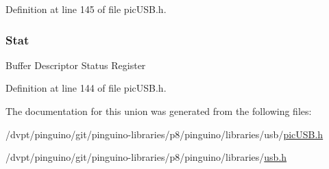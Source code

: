 Definition at line 145 of file pic\-U\-S\-B.\-h.

\hypertarget{union_buffer_descriptor_table_a6cd0cf5f5c11f77a2597bd70e392b4b8}{
\subsubsection[{Stat}]{ Stat}}\label{union_buffer_descriptor_table_a6cd0cf5f5c11f77a2597bd70e392b4b8}
Buffer Descriptor Status Register 

Definition at line 144 of file pic\-U\-S\-B.\-h.



The documentation for this union was generated from the following files\-:\begin{DoxyCompactItemize}
\item 
/dvpt/pinguino/git/pinguino-\/libraries/p8/pinguino/libraries/usb/\hyperlink{pic_u_s_b_8h}{pic\-U\-S\-B.\-h}\item 
/dvpt/pinguino/git/pinguino-\/libraries/p8/pinguino/libraries/\hyperlink{usb_8h}{usb.\-h}\end{DoxyCompactItemize}
